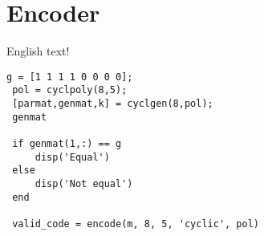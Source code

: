\documentclass[Main]{subfiles}
\begin{document}
\section*{Encoder}

English text!

\begin{lstlisting}[caption=Overskrift, style=Code-Matlab, label=lst:refID]
 g = [1 1 1 1 0 0 0 0];
 pol = cyclpoly(8,5);
 [parmat,genmat,k] = cyclgen(8,pol);
 genmat

 if genmat(1,:) == g
     disp('Equal')
 else
     disp('Not equal')
 end

 valid_code = encode(m, 8, 5, 'cyclic', pol)
\end{lstlisting}
\end{document}
